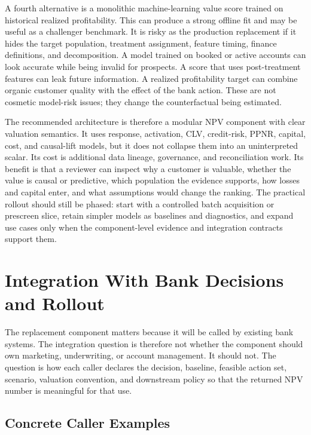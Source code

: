 \documentclass[11pt]{article}
\newcommand{\1}{\mathbf{1}}
\begin{document}
A fourth alternative is a monolithic machine-learning value score trained on
historical realized profitability. This can produce a strong offline fit and
may be useful as a challenger benchmark. It is risky as the production
replacement if it hides the target population, treatment assignment, feature
timing, finance definitions, and decomposition. A model trained on booked or
active accounts can look accurate while being invalid for prospects. A score
that uses post-treatment features can leak future information. A realized
profitability target can combine organic customer quality with the effect of
the bank action. These are not cosmetic model-risk issues; they change the
counterfactual being estimated.

The recommended architecture is therefore a modular NPV component with clear
valuation semantics. It uses response, activation, CLV, credit-risk, PPNR,
capital, cost, and causal-lift models, but it does not collapse them into an
uninterpreted scalar. Its cost is additional data lineage, governance, and
reconciliation work. Its benefit is that a reviewer can inspect why a customer
is valuable, whether the value is causal or predictive, which population the
evidence supports, how losses and capital enter, and what assumptions would
change the ranking. The practical rollout should still be phased: start with a
controlled batch acquisition or prescreen slice, retain simpler models as
baselines and diagnostics, and expand use cases only when the component-level
evidence and integration contracts support them.


\section{Integration With Bank Decisions and Rollout}
\label{sec:v4-integration-rollout}

The replacement component matters because it will be called by existing bank
systems.  The integration question is therefore not whether the component should
own marketing, underwriting, or account management.  It should not.  The
question is how each caller declares the decision, baseline, feasible action set,
scenario, valuation convention, and downstream policy so that the returned NPV
number is meaningful for that use.

\subsection{Concrete Caller Examples}
\label{subsec:concrete-caller-examples}
\end{document}
